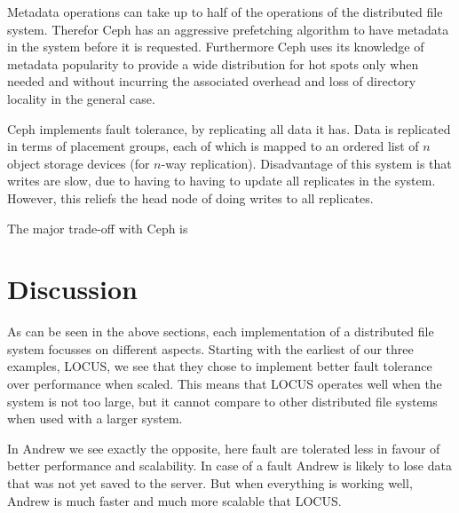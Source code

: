 \documentclass[a4paper,12px]{article}
\begin{document}
Metadata operations can take up to half of the operations of the distributed
file system. Therefor Ceph has an aggressive prefetching algorithm to have
metadata in the system before it is requested.  Furthermore Ceph uses its
knowledge of metadata popularity to provide a wide distribution for hot spots
only when needed and without incurring the associated overhead and loss of
directory locality in the general case.

Ceph implements fault tolerance, by replicating all data it has. Data is
replicated in terms of placement groups, each of which is mapped to an ordered
list of $n$ object storage devices (for $n$-way replication).
\cite{weil2006ceph} Disadvantage of this system is that writes are slow, due to
having to having to update all replicates in the system. However, this reliefs
the head node of doing writes to all replicates.

The major trade-off with Ceph is %

\section{Discussion}
As can be seen in the above sections, each implementation of a distributed file
system focusses on different aspects. Starting with the earliest of our three
examples, LOCUS, we see that they chose to implement better fault tolerance over
performance when scaled. This means that LOCUS operates well when the system is
not too large, but it cannot compare to other distributed file systems when used
with a larger system.

In Andrew we see exactly the opposite, here fault are tolerated less in favour
of better performance and scalability. In case of a fault Andrew is likely to
lose data that was not yet saved to the server. But when everything is working
well, Andrew is much faster and much more scalable that LOCUS.




\clearpage


\end{document}
